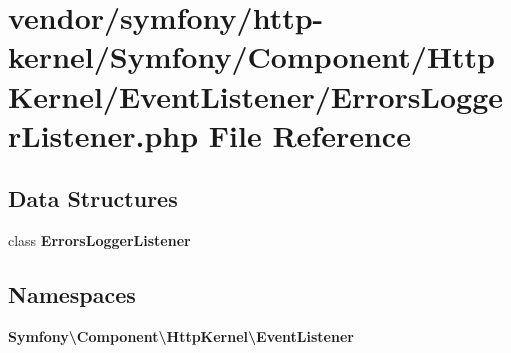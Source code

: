 \section{vendor/symfony/http-\/kernel/\+Symfony/\+Component/\+Http\+Kernel/\+Event\+Listener/\+Errors\+Logger\+Listener.php File Reference}
\label{_errors_logger_listener_8php}
\subsection*{Data Structures}
\begin{DoxyCompactItemize}
\item 
class {\bf Errors\+Logger\+Listener}
\end{DoxyCompactItemize}
\subsection*{Namespaces}
\begin{DoxyCompactItemize}
\item 
 {\bf Symfony\textbackslash{}\+Component\textbackslash{}\+Http\+Kernel\textbackslash{}\+Event\+Listener}
\end{DoxyCompactItemize}
